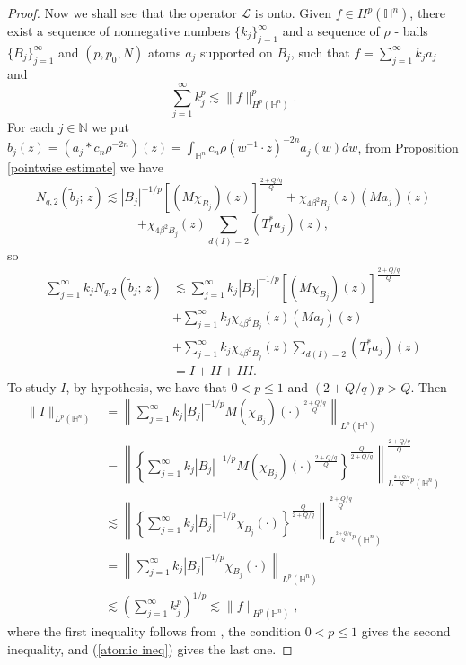 \documentclass[reqno,10pt]{article}
\theoremstyle{definition}
\numberwithin{equation}{section}
\numberwithin{theorem}{section}
\begin{document}
\begin{proof}
Now we shall see that the operator $\mathcal{L}$ is onto. Given $f \in H^{p}(\mathbb{H}^{n})$, there exist a sequence of nonnegative numbers 
$\{ k_j \}_{j=1}^{\infty}$ and a sequence of $\rho$ - balls $\{B_j \}_{j=1}^{\infty}$ and $(p, p_0, N)$ atoms $a_j$ supported on $B_j$, 
such that $f= \sum_{j=1}^{\infty} k_j a_j$ and
\begin{equation} \label{atomic ineq}
\sum_{j=1}^{\infty} k_{j}^{p} \lesssim \|f \|_{H^{p}(\mathbb{H}^{n})}^{p}.
\end{equation}
For each $j \in \mathbb{N}$ we put $b_j(z)= (a_j \ast c_n \rho^{-2n})(z) = \int_{\mathbb{H}^{n}} c_n \rho(w^{-1} \cdot z)^{-2n} a_j(w) dw$, from Proposition \ref{pointwise estimate} we have
\[
N_{q, 2} \left(\widetilde{b}_j; \, z \right) \lesssim | B_j|^{-1/p} \left[(M \chi_{B_j})(z) \right]^{\frac{2 + Q/q}{Q}} + 
\chi_{4 \beta^2 B_j}(z) (M a_j)(z) 
\]
\[
+ \chi_{4 \beta^2 B_j}(z) \sum_{d(I)=2} (T^{*}_{I} a_j)(z),
\]
so
\begin{equation*}
\begin{split}
\sum_{j=1}^{\infty} k_j N_{q, 2} \left(\widetilde{b}_j; \, z \right) & \lesssim \sum_{j=1}^{\infty} k_j | B_j|^{-1/p} 
\left[(M \chi_{B_j})(z) \right]^{\frac{2 + Q/q}{Q}} \\
& + \sum_{j=1}^{\infty} k_j \chi_{4 \beta^2 B_j}(z) (M a_j)(z) \\
& + \sum_{j=1}^{\infty} k_j \chi_{4 \beta^2 B_j}(z) \sum_{d(I)=2} (T^{*}_{I} a_j)(z) \\
& = I + II + III.
\end{split}
\end{equation*}
To study $I$, by hypothesis, we have that $0 < p \leq 1$ and $(2 + Q/q) p > Q$. Then
\begin{equation*}
\begin{split}
\|I\|_{L^{p}(\mathbb{H}^{n})} & = \left\| \sum_{j=1}^{\infty} k_j |B_j|^{-1/p} M(\chi_{B_j})(\cdot)^{\frac{2 + Q/q}{Q}} 
\right\|_{L^{p}(\mathbb{H}^{n})} \\
& = \left\| \left\{ \sum_{j=1}^{\infty} k_j |B_j|^{-1/p} M(\chi_{B_j})(\cdot)^{\frac{2 + Q/q}{Q}} \right\}^{\frac{Q}{2 + Q/q}} 
\right\|_{L^{\frac{2 + Q/q}{Q} p}(\mathbb{H}^{n})}^{\frac{2 + Q/q}{Q}} \\
& \lesssim \left\| \left\{ \sum_{j=1}^{\infty} k_j |B_j|^{-1/p} \chi_{B_j}(\cdot)  \right\}^{\frac{Q}{2 + Q/q}} 
\right\|_{L^{\frac{2 + Q/q}{Q} p}(\mathbb{H}^{n})}^{\frac{2 + Q/q}{Q}} \\
& = \left\| \sum_{j=1}^{\infty} k_j |B_j|^{-1/p} \chi_{B_j}(\cdot) \right\|_{L^{p}(\mathbb{H}^{n})} \\
& \lesssim \left( \sum_{j=1}^{\infty} k_{j}^{p} \right)^{1/p} \lesssim \|f \|_{H^{p}(\mathbb{H}^{n})},
\end{split}
\end{equation*}
where the first inequality follows from \cite[Theorem 1.2]{Grafakos}, the condition $0 < p \leq 1$ gives the second inequality, and 
(\ref{atomic ineq}) gives the last one.


\end{proof}
\end{document}
